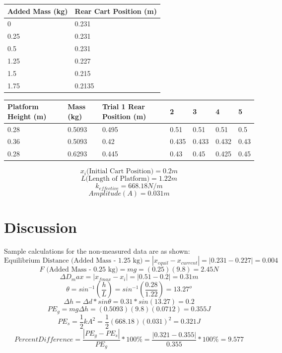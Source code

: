 \documentclass[11pt, titlepage]{article}
\begin{document}
\begin{center}
\begin{tabular}
{|m{15em}|m{15em}|}
\hline
Added Mass (kg) & Rear Cart Position (m) \\
\hline
0 & 0.231 \\
\hline
0.25 & 0.231 \\
\hline
0.5 & 0.231 \\
\hline
1.25 & 0.227 \\
\hline
1.5 & 0.215 \\
\hline
1.75 & 0.2135 \\
\hline
\end{tabular}

\begin{tabular}
{|m{5em}|m{5em}|m{5em}|m{5em}|m{5em}|m{5em}|m{5em}|}
\hline
Platform Height (m) & Mass (kg) & Trial 1 Rear Position (m) & 2 & 3 & 4 & 5 \\
\hline
0.28 & 0.5093 & 0.495 & 0.51 & 0.51 & 0.51 & 0.5 \\
\hline
0.36 & 0.5093 & 0.42 & 0.435 & 0.433 & 0.432 & 0.43 \\
\hline
0.28 & 0.6293 & 0.445 & 0.43 & 0.45 & 0.425 & 0.45 \\
\hline
\end{tabular}

$$x_i \text{(Initial Cart Position)} = 0.2 m$$
$$L \text{(Length of Platform)} = 1.22 m$$
$$k_{effective} = 668.18 N/m$$
$$Amplitude (A) = 0.031 m$$
\end{center}

\section*{Discussion}
Sample calculations for the non-measured data are as shown:
$$\text{Equilibrium Distance (Added Mass - 1.25 kg)} = |x_{equil} - x_{current}| = |0.231 - 0.227| = 0.004$$ 
$$F \text{ (Added Mass - 0.25 kg)} = mg = (0.25)(9.8) = 2.45 N$$
$$\Delta D_max = |x_{fmax} - x_i| = |0.51 - 0.2| = 0.31 m$$
$$\theta = sin^{-1}(\frac{h}{L}) = sin^{-1}(\frac{0.28}{1.22}) = 13.27^o$$
$$\Delta h = \Delta d * sin\theta = 0.31 * sin(13.27) = 0.2$$
$$PE_g = mg\Delta h = (0.5093)(9.8)(0.0712) = 0.355 J$$
$$PE_s = \frac{1}{2}kA^2 = \frac{1}{2}(668.18)(0.031)^2 = 0.321 J$$
$$Percent Difference = \frac{|PE_g - PE_s|}{PE_g} * 100\% = \frac{|0.321 - 0.355|}{0.355} * 100\% = 9.577$$
\end{document}
